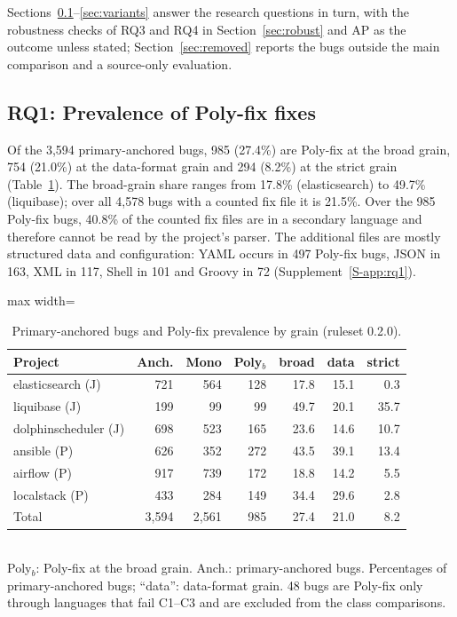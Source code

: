 \documentclass[a4paper,fleqn]{cas-dc}
\begin{document}
Sections~\ref{sec:rq1}--\ref{sec:variants} answer the research questions in
turn, with the robustness checks of RQ3 and RQ4 in Section~\ref{sec:robust}
and AP as the outcome unless stated; Section~\ref{sec:removed} reports the
bugs outside the main comparison and a source-only evaluation.

\subsection{RQ1: Prevalence of Poly-fix fixes}\label{sec:rq1}

Of the 3{,}594 primary-anchored bugs, 985 (27.4\%) are Poly-fix at the broad
grain, 754 (21.0\%) at the data-format grain and 294 (8.2\%) at the strict
grain (Table~\ref{tab:dataset}). The broad-grain share ranges from 17.8\%
(elasticsearch) to 49.7\% (liquibase); over all 4{,}578 bugs with a counted fix
file it is 21.5\%. Over the 985 Poly-fix bugs, 40.8\% of the counted fix files
are in a secondary language and therefore cannot be read by the project's
parser. The additional files are mostly structured data and configuration:
YAML occurs in 497 Poly-fix bugs, JSON in 163, XML in 117, Shell in 101 and
Groovy in 72 (Supplement~\ref{S-app:rq1}).

\begin{table}[t]
\caption{Primary-anchored bugs and Poly-fix prevalence by grain (ruleset 0.2.0).}
\label{tab:dataset}
\small
\setlength{\tabcolsep}{3pt}
\begin{adjustbox}{max width=\linewidth}\begin{tabular}{lrrrrrr}
\toprule
Project & Anch. & Mono & Poly$_b$ & broad & data & strict \\
\midrule
elasticsearch (J) & 721 & 564 & 128 & 17.8 & 15.1 & 0.3 \\
liquibase (J) & 199 & 99 & 99 & 49.7 & 20.1 & 35.7 \\
dolphinscheduler (J) & 698 & 523 & 165 & 23.6 & 14.6 & 10.7 \\
ansible (P) & 626 & 352 & 272 & 43.5 & 39.1 & 13.4 \\
airflow (P) & 917 & 739 & 172 & 18.8 & 14.2 & 5.5 \\
localstack (P) & 433 & 284 & 149 & 34.4 & 29.6 & 2.8 \\
\midrule
Total & 3{,}594 & 2{,}561 & 985 & 27.4 & 21.0 & 8.2 \\
\bottomrule
\end{tabular}\end{adjustbox}
\\[2pt]{\footnotesize Poly$_b$: Poly-fix at the broad grain. Anch.: primary-anchored bugs. Percentages of primary-anchored bugs; ``data'': data-format grain. 48 bugs are Poly-fix only through languages that fail C1--C3 and are excluded from the class comparisons.}
\end{table}
\end{document}
